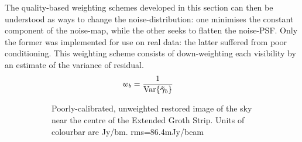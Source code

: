 \pg
The quality-based weighting schemes developed in this section can then be understood as ways to change the noise-distribution: one minimises the constant component of the noise-map, while the other seeks to flatten the noise-PSF. Only the former was implemented for use on real data: the latter suffered from poor conditioning. This weighting scheme consists of down-weighting each visibility by an estimate of the variance of residual.
\begin{align}
w_{b} &= \frac{1}{\textrm{Var}\{\bm{\tilde{\gamma}}_{b}\}}
\end{align}

\begin{figure}[h!]
\begin{subfigure}{.49\textwidth}
\caption{\label{image.3c295.nocorr1} Poorly-calibrated, unweighted restored image of the sky near the centre of the Extended Groth Strip. {Units of colourbar are Jy/bm}. rms=86.4mJy/beam}
\end{subfigure}
\begin{subfigure}{.49\textwidth}

\end{subfigure}
\end{figure}
